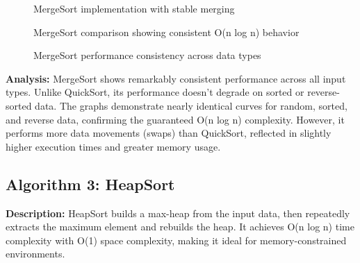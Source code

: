 \documentclass[12pt]{article}
\begin{document}
\begin{figure}[H]
    \centering
    \caption{MergeSort implementation with stable merging}
    \label{fig:mergesort_impl}
\end{figure}

\begin{figure}[H]
    \centering
    \caption{MergeSort comparison showing consistent O(n log n) behavior}
    \label{fig:mergesort_graph}
\end{figure}

\begin{figure}[H]
    \centering
    \caption{MergeSort performance consistency across data types}
    \label{fig:mergesort_datatypes}
\end{figure}

\textbf{Analysis:} MergeSort shows remarkably consistent performance across all input types. Unlike QuickSort, its performance doesn't degrade on sorted or reverse-sorted data. The graphs demonstrate nearly identical curves for random, sorted, and reverse data, confirming the guaranteed O(n log n) complexity. However, it performs more data movements (swaps) than QuickSort, reflected in slightly higher execution times and greater memory usage.

\clearpage
\subsection{Algorithm 3: HeapSort}

\textbf{Description:} HeapSort builds a max-heap from the input data, then repeatedly extracts the maximum element and rebuilds the heap. It achieves O(n log n) time complexity with O(1) space complexity, making it ideal for memory-constrained environments.
\end{document}
